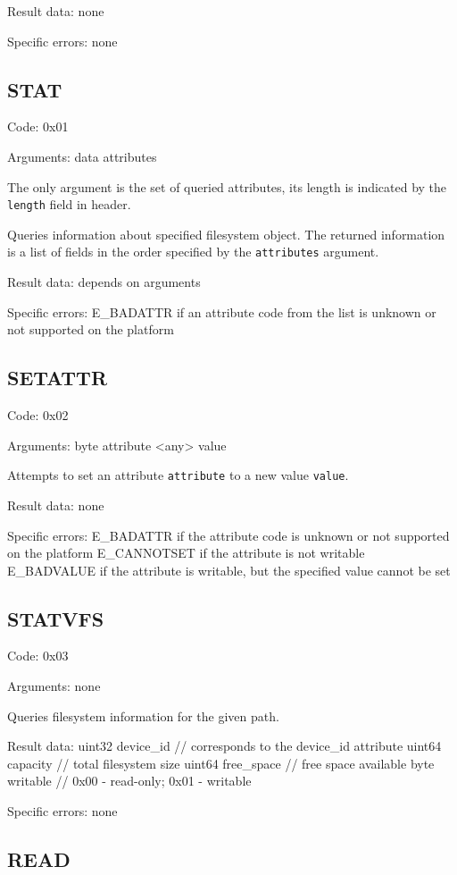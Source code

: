 Result data: none

Specific errors: none

\subsection{STAT}

Code: 0x01

Arguments:
data attributes

The only argument is the set of queried attributes, its length is indicated by the {\tt length} field in
header.

Queries information about specified filesystem object. The returned information is a list of fields in the
order specified by the {\tt attributes} argument.

Result data: depends on arguments

Specific errors:
	E\_BADATTR if an attribute code from the list is unknown or not supported on the platform

\subsection{SETATTR}

Code: 0x02

Arguments:
byte attribute
<any> value

Attempts to set an attribute {\tt attribute} to a new value {\tt value}.

Result data: none

Specific errors:
	E\_BADATTR if the attribute code is unknown or not supported on the platform
	E\_CANNOTSET if the attribute is not writable
	E\_BADVALUE if the attribute is writable, but the specified value cannot be set

\subsection{STATVFS}

Code: 0x03

Arguments: none

Queries filesystem information for the given path.

Result data:
uint32 device\_id // corresponds to the device\_id attribute
uint64 capacity // total filesystem size
uint64 free\_space // free space available
byte writable // 0x00 - read-only; 0x01 - writable

Specific errors: none

\subsection{READ}

